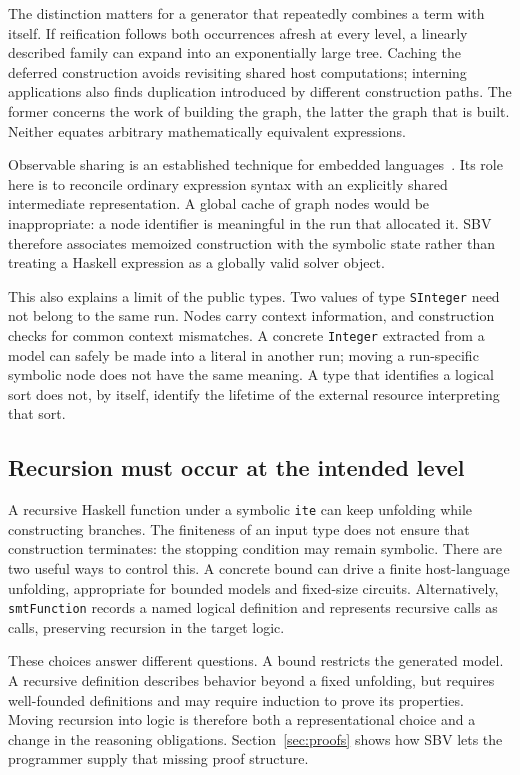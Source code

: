 \documentclass[acmsmall,screen,nonacm]{acmart}
\newcommand{\code}[1]{\texttt{#1}}
\begin{document}
The distinction matters for a generator that repeatedly combines a term with
itself. If reification follows both occurrences afresh at every level, a
linearly described family can expand into an exponentially large tree. Caching
the deferred construction avoids revisiting shared host computations; interning
applications also finds duplication introduced by different construction paths.
The former concerns the work of building the graph, the latter the graph that
is built. Neither equates arbitrary mathematically equivalent expressions.

Observable sharing is an established technique for embedded
languages~\citep{sharing}. Its role here is to reconcile ordinary expression
syntax with an explicitly shared intermediate representation. A global cache
of graph nodes would be inappropriate: a node identifier is meaningful in the
run that allocated it. SBV therefore associates memoized construction with the
symbolic state rather than treating a Haskell expression as a globally valid
solver object.

This also explains a limit of the public types. Two values of type
\code{SInteger} need not belong to the same run. Nodes carry context information,
and construction checks for common context mismatches. A concrete
\code{Integer} extracted from a model can safely be made into a literal in
another run; moving a run-specific symbolic node does not have the same meaning.
A type that identifies a logical sort does not, by itself, identify the lifetime
of the external resource interpreting that sort.

\subsection{Recursion must occur at the intended level}

A recursive Haskell function under a symbolic \code{ite} can keep unfolding
while constructing branches. The finiteness of an input type does not ensure
that construction terminates: the stopping condition may remain symbolic.
There are two useful ways to control this. A concrete bound can drive a finite
host-language unfolding, appropriate for bounded models and fixed-size circuits.
Alternatively, \code{smtFunction} records a named logical definition and
represents recursive calls as calls, preserving recursion in the target logic.

These choices answer different questions. A bound restricts the generated
model. A recursive definition describes behavior beyond a fixed unfolding,
but requires well-founded definitions and may require induction to prove its
properties. Moving recursion into logic is therefore both a representational
choice and a change in the reasoning obligations. Section~\ref{sec:proofs}
shows how SBV lets the programmer supply that missing proof structure.
\end{document}
